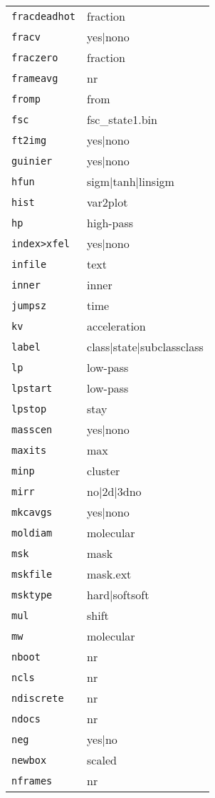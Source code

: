 \documentclass[review]{elsarticle}
\begin{document}
\begin{tabular}{ll}
\texttt{fracdeadhot}&{fraction}\\
\texttt{fracv}&{yes|no{no}}\\
\texttt{fraczero}&{fraction}\\
\texttt{frameavg}&{nr}\\
\texttt{fromp}&{from}\\
\texttt{fsc}&{fsc\_state1.bin}\\
\texttt{ft2img}&{yes|no{no}}\\
\texttt{guinier}&{yes|no{no}}\\
\texttt{hfun}&{sigm|tanh|lin{sigm}}\\
\texttt{hist}&{var2plot}\\
\texttt{hp}&{high-pass}\\
\texttt{index>xfel}&{yes|no{no}}\\
\texttt{infile}&{text}\\
\texttt{inner}&{inner}\\
\texttt{jumpsz}&{time}\\
\texttt{kv}&{acceleration}\\
\texttt{label}&{class|state|subclass{class}}\\
\texttt{lp}&{low-pass}\\
\texttt{lpstart}&{low-pass}\\
\texttt{lpstop}&{stay}\\
\texttt{masscen}&{yes|no{no}}\\
\texttt{maxits}&{max}\\
\texttt{minp}&{cluster}\\
\texttt{mirr}&{no|2d|3d{no}}\\
\texttt{mkcavgs}&{yes|no{no}}\\
\texttt{moldiam}&{molecular}\\
\texttt{msk}&{mask}\\
\texttt{mskfile}&{mask.ext}\\
\texttt{msktype}&{hard|soft{soft}}\\
\texttt{mul}&{shift}\\
\texttt{mw}&{molecular}\\
\texttt{nboot}&{nr}\\
\texttt{ncls}&{nr}\\
\texttt{ndiscrete}&{nr}\\
\texttt{ndocs}&{nr}\\
\texttt{neg}&{yes|no}\\
\texttt{newbox}&{scaled}\\
\texttt{nframes}&{nr}\\

\end{tabular}
\end{document}

